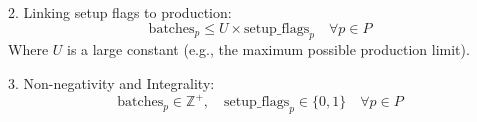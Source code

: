 \documentclass{article}
\begin{document}
2. Linking setup flags to production:
   \[
   \text{batches}_p \leq U \times \text{setup\_flags}_p \quad \forall p \in P 
   \]
   Where \( U \) is a large constant (e.g., the maximum possible production limit).

3. Non-negativity and Integrality:
   \[
   \text{batches}_p \in \mathbb{Z}^+, \quad \text{setup\_flags}_p \in \{0, 1\} \quad \forall p \in P
   \]
\end{document}
